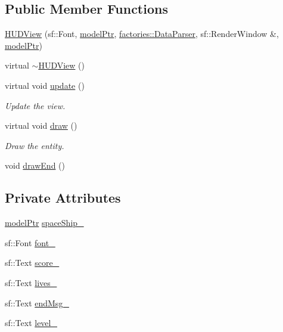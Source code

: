 \subsection*{\-Public \-Member \-Functions}
\begin{DoxyCompactItemize}
\item 
\hyperlink{classviews_1_1HUDView_a1e09dbfb67dea58543b915b6508fc48b}{\-H\-U\-D\-View} (sf\-::\-Font, \hyperlink{ModelView_8h_a78966ddb517fca8d2b29a2bc5c31e74e}{model\-Ptr}, \hyperlink{classfactories_1_1DataParser}{factories\-::\-Data\-Parser}, sf\-::\-Render\-Window \&, \hyperlink{ModelView_8h_a78966ddb517fca8d2b29a2bc5c31e74e}{model\-Ptr})
\item 
virtual \hyperlink{classviews_1_1HUDView_a2d8d5a6fae758dc6b271e04c05bcf1a7}{$\sim$\-H\-U\-D\-View} ()
\item 
virtual void \hyperlink{classviews_1_1HUDView_ade6f7d917f515422ed084164a547bd0c}{update} ()
\begin{DoxyCompactList}\small\item\em \-Update the view. \end{DoxyCompactList}\item 
virtual void \hyperlink{classviews_1_1HUDView_a8abeb49c748f6f1d59af9b6d1e095acd}{draw} ()
\begin{DoxyCompactList}\small\item\em \-Draw the entity. \end{DoxyCompactList}\item 
void \hyperlink{classviews_1_1HUDView_ac297b6313d8c5ce5dcda335ca968fae4}{draw\-End} ()
\end{DoxyCompactItemize}
\subsection*{\-Private \-Attributes}
\begin{DoxyCompactItemize}
\item 
\hyperlink{ModelView_8h_a78966ddb517fca8d2b29a2bc5c31e74e}{model\-Ptr} \hyperlink{classviews_1_1HUDView_a0016ba3cfd9731897e5f2c4586bca6fb}{space\-Ship\-\_\-}
\item 
sf\-::\-Font \hyperlink{classviews_1_1HUDView_a11ebaa9ced8cc7114d9561bfba53fb7c}{font\-\_\-}
\item 
sf\-::\-Text \hyperlink{classviews_1_1HUDView_ab6665535a79da68caf11bb31f52afe85}{score\-\_\-}
\item 
sf\-::\-Text \hyperlink{classviews_1_1HUDView_a28c0b2506ee33cb13d2f8099eb761b01}{lives\-\_\-}
\item 
sf\-::\-Text \hyperlink{classviews_1_1HUDView_aa4e8659db4119ca754670c9f339fc022}{end\-Msg\-\_\-}
\item 
sf\-::\-Text \hyperlink{classviews_1_1HUDView_a05ffc54debbdbe11d37a90dd16c01819}{level\-\_\-}
\end{DoxyCompactItemize}


